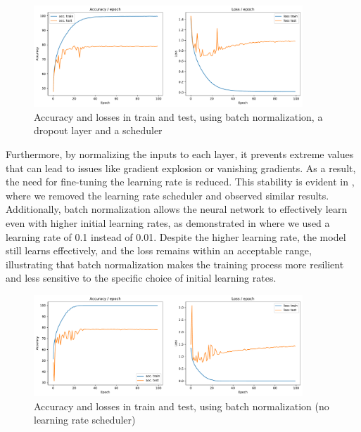 \begin{figure}[H]
    \centering
    \includegraphics*[width=0.9\textwidth]{figs/CNN/batchnorm_with_dropout.pdf}
    \caption{Accuracy and losses in train and test, using batch normalization, a dropout layer and a scheduler}
    \label{fig:batchnorm_with_dropout}
\end{figure}

Furthermore, by normalizing the inputs to each layer, it prevents extreme values that can lead to issues like gradient explosion or vanishing gradients. As a result, the need for fine-tuning the learning rate is reduced. This stability is evident in , where we removed the learning rate scheduler and observed similar results. Additionally, batch normalization allows the neural network to effectively learn even with higher initial learning rates, as demonstrated in  where we used a learning rate of 0.1 instead of 0.01. Despite the higher learning rate, the model still learns effectively, and the loss remains within an acceptable range, illustrating that batch normalization makes the training process more resilient and less sensitive to the specific choice of initial learning rates.

\begin{figure}[H]
    \centering
    \includegraphics*[width=0.9\textwidth]{figs/CNN/batchnorm_no_scheduler.pdf}
    \caption{Accuracy and losses in train and test, using batch normalization (no learning rate scheduler)}
    \label{fig:batchnorm_no_scheduler}
\end{figure}

